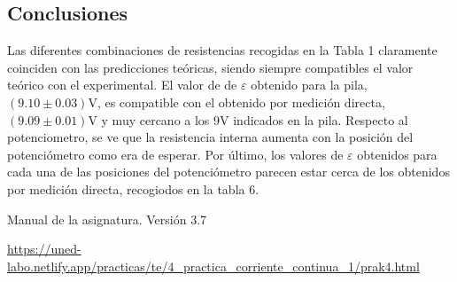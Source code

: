 \documentclass{article}
\begin{document}
\begin{multicols}{2}
\section*{Conclusiones}
Las diferentes combinaciones de resistencias recogidas en la Tabla 1 claramente coinciden con las predicciones teóricas, siendo siempre compatibles el valor teórico con el experimental. El valor de de $\varepsilon$ obtenido para la pila, $(9.10 \pm 0.03) \text{V}$, es compatible con el obtenido por medición directa, $(9.09 \pm 0.01) \text{V}$ y muy cercano a los 9V indicados en la pila. Respecto al potenciometro, se ve que la resistencia interna aumenta con la posición del potenciómetro como era de esperar. Por último, los valores de $\varepsilon$ obtenidos para cada una de las posiciones del potenciómetro parecen estar cerca de los obtenidos por medición directa, recogiodos en la tabla 6.

\begin{thebibliography}{1}

  Manual de la asignatura. Versión 3.7

  \url{https://uned-labo.netlify.app/practicas/te/4_practica_corriente_continua_1/prak4.html}

\end{thebibliography}
\end{multicols}
\end{document}
